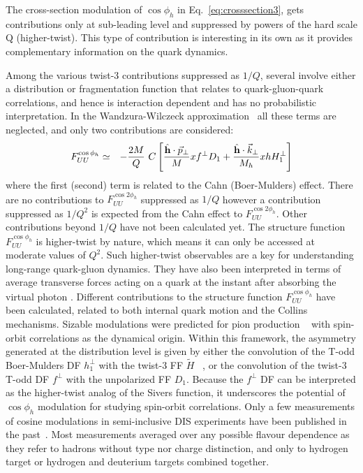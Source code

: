 \documentclass[aps,prl,twocolumn,showpacs,superscriptaddress,groupedaddress]{revtex4-1}  %
\newcommand{\FUUc}{F_{UU}^{\cos\phi_h}}
\newcommand{\FUUcc}{F_{UU}^{\cos2\phi_h}}
\newcommand{\kt}{\vec{k}_\perp}
\newcommand{\pt}{\vec{p}_\perp}
\newcommand{\ph}{\phi_h}
\begin{document}
The cross-section modulation of  $\cos \phi_h $ in Eq.~\ref{eq:crosssection3}, gets contributions only
at sub-leading level and suppressed by powers of the hard scale Q (higher-twist).
This type of contribution is interesting in its own as it provides complementary information
on the quark dynamics.

Among the various twist-3 contributions suppressed as $1/Q$, several involve
either a distribution or fragmentation function that relates to
quark-gluon-quark correlations, and hence is interaction dependent and has no probabilistic
interpretation. In the Wandzura-Wilczeck approximation~\cite{Wandzura:1977qf}
all these terms are neglected, and only two contributions are considered: %
\begin{eqnarray} \nonumber
\label{Eq:cosphi}
\FUUc & \simeq & -\frac{2M}{Q}\  C\left[\frac{ \hat{\bf h} \cdot \pt}{M} xf^\perp D_1 +
\frac{\hat{\bf h} \cdot \kt}{M_h} 
xh H_1^\perp \right] \\
\end{eqnarray}
where the first (second) term is related to the Cahn (Boer-Mulders) effect.
There are no contributions to $\FUUcc$ suppressed as $1/Q$ however a contribution suppressed as $1/Q^2$ is expected from the Cahn effect to $\FUUcc$.
Other contributions beyond $1/Q$ have not been calculated yet.
The structure function $F^{\cos \ph}_{UU}$ is higher-twist by nature, which means it can only be accessed at moderate values of $Q^2$.
Such higher-twist observables are a key for understanding long-range quark-gluon dynamics.
They have also been interpreted in terms of average transverse forces acting on a quark at the instant after absorbing the virtual photon \cite{Burkardt:2008vd}.
Different contributions to the structure function  $F^{\cos \ph}_{UU}$ have been calculated, related to both internal quark motion and the Collins mechanisms.
Sizable modulations  were predicted for pion production ~\cite{Anselmino:2005nn} with spin-orbit correlations   as the dynamical origin.
Within this framework, the asymmetry generated at the distribution level is given by either the convolution of the T-odd Boer-Mulders DF $h_1^{\perp}$ with the twist-3 FF $\tilde{H}$ ~\cite{Bacchetta:2006tn}, or the convolution of the  twist-3 T-odd DF $f^\perp$ with the unpolarized FF $D_1$\cite{Metz:2004je}.
Because the $f^\perp$ DF can be interpreted as the higher-twist analog of the Sivers function, it underscores the potential of $\cos\phi_h$ modulation for studying spin-orbit correlations. 
Only a few measurements of cosine modulations in semi-inclusive DIS experiments have been published in the past~\cite{Aubert:1983cz,Arneodo:1986cf,Adams:1993hs,Breitweg:2000qh}.
Most measurements averaged over any possible flavour dependence as they refer to hadrons without type nor charge distinction, and only to hydrogen target or hydrogen and deuterium targets combined together.
\end{document}
